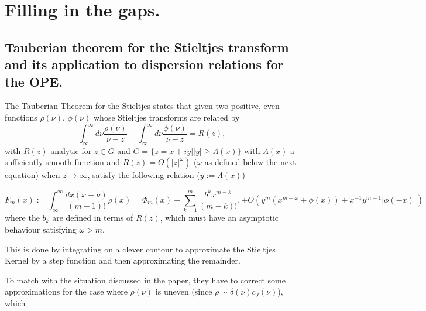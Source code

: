 \documentclass[letterpaper]{article}
\begin{document}
\section{Filling in the gaps.}

\subsection{Tauberian theorem for the Stieltjes transform and its application to
dispersion relations for the OPE.}
The Tauberian Theorem for the Stieltjes states that given two positive, even
functions $\rho(\nu)$, $\phi(\nu)$ whose Stieltjes transforms are related by
\begin{equation}
  \int_\infty^\infty d\nu \frac{\rho(\nu)}{\nu - z}
  -
  \int_\infty^\infty d\nu \frac{\phi(\nu)}{\nu - z}
  =
  R(z),
\end{equation}
with $R(z)$ analytic for $z\in G$ and $G = \{ z = x+ iy | |y|\geq\Lambda(x)\}$
with $\Lambda(x)$ a sufficiently smooth function and $R(z) = O(|z|^{\omega})$
($\omega$ as defined below the next equation)
when $z\to \infty$, satisfy the following relation ($y:=\Lambda(x)$)

\begin{equation}
  F_m(x)
  :=
  \int_\infty^\infty \frac{dx (x-\nu)}{(m-1)!} \rho(x)
  =
  \Phi_m(x)
  +
  \sum_{k=1}^m \frac{ b^k x^{m-k}}{(m-k)!},
  +O(y^m (x^{m-\omega} + \phi(x)) + x^{-1} y^{m+1}|\phi(-x)|)
\end{equation}
where the $b_k$ are defined in terms of $R(z)$, which must have an asymptotic
behaviour satisfying $\omega >m$.

This is done by integrating on a clever contour to approximate the Stieltjes
Kernel by a step function and then approximating the remainder.

To match with the situation discussed in the paper, they have to correct some
approximations for the case where $\rho(\nu)$ is uneven (since $\rho \sim \delta
(\nu) c_J(\nu)$), which 






















  
\end{document}
